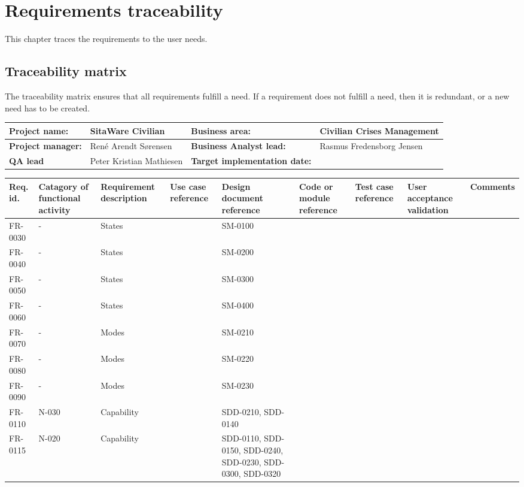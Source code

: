 \chapter{Requirements traceability}
This chapter traces the requirements to the user needs.

\section{Traceability matrix}
The traceability matrix ensures that all requirements fulfill a need. If a requirement does not fulfill a need, then it is redundant, or a new need has to be created.


\begin{sidewaystable}
\begin{table}[H]
\begin{tabular}{|l|l|l|l|}
\hline
 \textbf{Project name:} & SitaWare Civilian & \textbf{Business area:}  & Civilian Crises Management\\ \hline
 \textbf{Project manager:} & René Arendt Sørensen & \textbf{Business Analyst lead:} & Rasmus Fredensborg  Jensen\\ \hline
 \textbf{QA lead} & Peter Kristian Mathiesen & \textbf{Target implementation date:}  & \\ \hline
\end{tabular}	
\begin{tabular}{|p{2cm}|p{2cm}|p{3cm}|p{2cm}|p{2cm}|p{2cm}|p{2cm}|p{2cm}|p{2cm}|}
\hline
 Req. id. & Catagory of functional activity & Requirement description  & Use case reference & Design document reference & Code or module reference & Test case reference & User acceptance validation & Comments\\ \hline
 FR-0030 & - & States & &SM-0100  & & & &\\ \hline 
FR-0040 & - & States & &SM-0200 & & & &\\ \hline  
FR-0050 & - & States & &SM-0300 & & & &\\ \hline  
FR-0060 & - & States & &SM-0400 & & & &\\ \hline  
FR-0070 & - & Modes & &SM-0210 & & & &\\ \hline  
FR-0080 & - & Modes & &SM-0220 & & & &\\ \hline 
FR-0090 & - & Modes & &SM-0230 & & & &\\ \hline 
 FR-0110 & N-030 & Capability & &SDD-0210, SDD-0140 & & & &\\ \hline
 FR-0115 & N-020 & Capability & &SDD-0110, SDD-0150, SDD-0240, SDD-0230, SDD-0300, SDD-0320& & & &\\ \hline

\end{tabular}
\end{table}
\end{sidewaystable}
